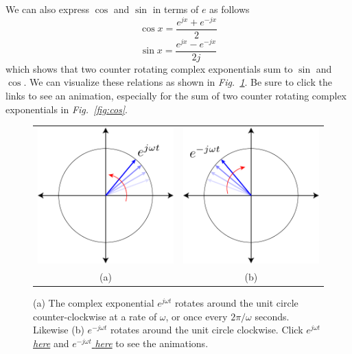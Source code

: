  We can also express $\cos$ and $\sin$ in terms of $e$ as follows
    \begin{equation}
        \cos x = \frac{e^{jx} + e^{-jx}}{2}
    \end{equation}
    \begin{equation}
        \sin x = \frac{e^{jx} - e^{-jx}}{2j}
    \end{equation}
which shows that two counter rotating complex exponentials sum to $\sin$ and $\cos$.  We can visualize these relations as shown in \emph{Fig.~\ref{fig:complexexp}}.  Be sure to click the links to see an animation, especially for the sum of two counter rotating complex exponentials in \emph{Fig.~\ref{fig:cos}}.
\begin{figure}[tb]
\centering
\begin{tabular}{cc}
\includegraphics[width=.4\columnwidth]{exp1.pdf}  &
\includegraphics[width=.4\columnwidth]{exp2.pdf} \\
(a) & (b) \\
\end{tabular}
\caption{  (a) The complex exponential $e^{j\omega t}$ rotates around the unit circle counter-clockwise at a rate of $\omega$, or once every $2\pi/\omega$ seconds.  Likewise (b) $e^{-j\omega t}$ rotates around the unit circle clockwise.  Click \href{http://rfic.eecs.berkeley.edu/~niknejad/photos/ee105/exp1.mov}{$e^{j\omega t}$ \emph{here}} and \href{http://rfic.eecs.berkeley.edu/~niknejad/photos/ee105/exp2.mov}{$e^{-j\omega t}$ \emph{here}} to see the animations.}
\label{fig:complexexp}
\end{figure}
